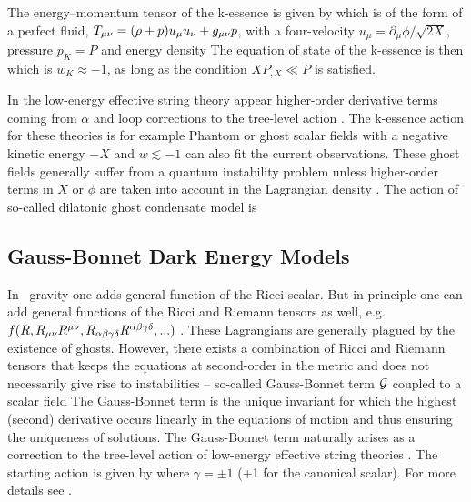The energy--momentum tensor of the k-essence is given by
which is of the form of a perfect fluid, $T_{\mu\nu}=(\rho+p)u_\mu u_\nu+g_{\mu\nu} p$, with a four-velocity $u_\mu=\partial_\mu\phi/\sqrt{2X}$, pressure $p_K=P$ and energy density
The equation of state of the k-essence is then
which is $w_K\approx-1$, as long as the condition $XP_{,X}\ll P$ is satisfied.

In the low-energy effective string theory appear higher-order derivative terms coming from $\alpha$ and loop corrections to the tree-level action \parencite{2003PhR...373....1G}. The k-essence action for these theories is for example
Phantom or ghost scalar fields with a negative kinetic energy $-X$ and $w\lesssim-1$ can also fit the current observations. These ghost fields generally suffer from a quantum instability problem unless higher-order terms in $X$ or $\phi$ are taken into account in the Lagrangian density \parencite{2010deto.book.....A}. The action of so-called dilatonic ghost condensate model is \parencite{2004JCAP...07..004P}
\subsection{Gauss-Bonnet Dark Energy Models}
In \fR\ gravity one adds general function of the Ricci scalar. But in principle one can add general functions of the Ricci and Riemann tensors as well, e.g. $f(R,R_{\mu\nu} R^{\mu\nu},R_{\alpha\beta\gamma\delta}R^{\alpha\beta\gamma\delta},...)$ \parencite{2005PhRvD..71f3513C}. These Lagrangians are generally plagued by the existence of ghosts.  However, there exists a combination of Ricci and Riemann tensors that keeps the equations at second-order in the metric and does not necessarily give rise to instabilities -- so-called Gauss-Bonnet term $\mathcal{G}$ coupled to a scalar field
The Gauss-Bonnet term is the unique invariant for which the highest (second) derivative occurs linearly in the equations of motion and thus ensuring the uniqueness of solutions. The Gauss-Bonnet term naturally arises as a correction to the tree-level action of low-energy effective string theories \parencite{2000PhR...337..343L}. The starting action is given by
where $\gamma=\pm1$ (+1 for the canonical scalar). For more details see \textcite{2005PhRvD..71l3509N,2006JCAP...06..004N,2013PhRvD..87h4037C}.
